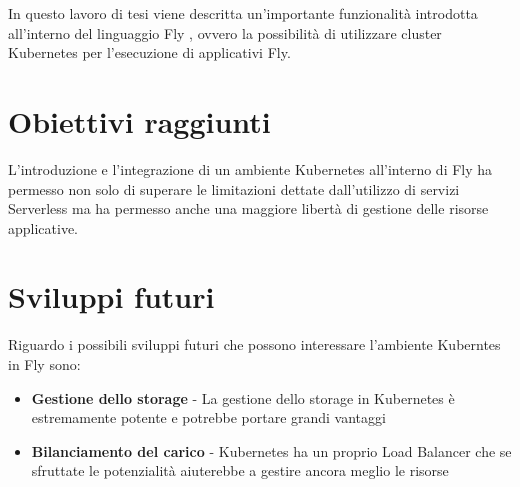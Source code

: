 In questo lavoro di tesi viene descritta un'importante funzionalità introdotta all'interno del linguaggio Fly \cite{ISISLab}, ovvero la possibilità di utilizzare cluster Kubernetes per l'esecuzione di applicativi Fly.\\

\section{Obiettivi raggiunti}
L'introduzione e l'integrazione di un ambiente Kubernetes all'interno di Fly ha permesso non solo di superare le limitazioni dettate dall'utilizzo di servizi Serverless ma ha permesso anche una maggiore libertà
di gestione delle risorse applicative.

\section{Sviluppi futuri}
Riguardo i possibili sviluppi futuri che possono interessare l'ambiente Kuberntes in Fly sono:

\begin{itemize}
    \item \textbf{Gestione dello storage} - La gestione dello storage in Kubernetes è estremamente potente e potrebbe portare grandi vantaggi
    \item \textbf{Bilanciamento del carico} - Kubernetes ha un proprio Load Balancer che se sfruttate le potenzialità aiuterebbe a gestire ancora meglio le risorse
\end{itemize}